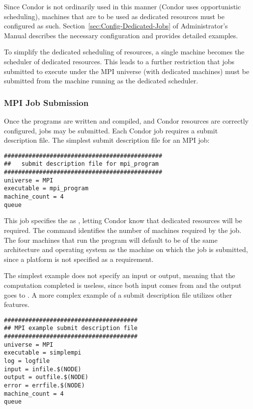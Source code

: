 Since Condor is not ordinarily used in this manner (Condor uses
opportunistic scheduling),
machines that are to be used as dedicated resources
must be configured as such.
Section~\ref{sec:Config-Dedicated-Jobs} of
Administrator's Manual describes the necessary
configuration and provides detailed examples.

To simplify the dedicated scheduling of resources,
a single machine becomes the scheduler of dedicated resources.
This leads to a further restriction that jobs submitted
to execute under the MPI universe (with dedicated machines)
must be
submitted from the machine running as the dedicated scheduler.

\subsubsection{\label{sec:MPI-submit}MPI Job Submission}

Once the programs are written and compiled, and Condor resources
are correctly configured, jobs may be submitted.
Each Condor job requires a submit description file.
The simplest submit description file for an MPI job:

\begin{verbatim}
#############################################
##   submit description file for mpi_program
#############################################
universe = MPI
executable = mpi_program
machine_count = 4
queue 
\end{verbatim}

This job specifies the  as ,
letting Condor know that dedicated resources will be required.
The  command identifies the number
of machines required by the job.
The four machines that run the program will default to
be of the same architecture
and operating system as the machine on which the job is submitted,
since a platform is not specified as a requirement.

The simplest example does not specify an input or output,
meaning that the computation completed is useless,
since both input comes from and the output goes to .
A more complex example of a submit description file
utilizes other features.
\begin{verbatim}
######################################
## MPI example submit description file
######################################
universe = MPI
executable = simplempi
log = logfile
input = infile.$(NODE)
output = outfile.$(NODE)
error = errfile.$(NODE)
machine_count = 4
queue
\end{verbatim}

